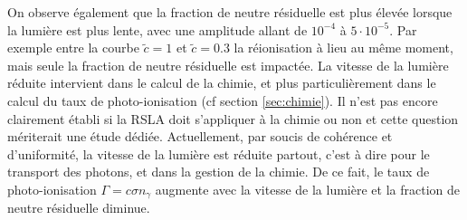 On observe également que la fraction de neutre résiduelle est plus élevée lorsque la lumière est plus lente, avec une amplitude allant de $10^{-4}$ à $5 \cdot 10 ^{-5}$.
Par exemple entre la courbe $\tilde{c}=1$ et $\tilde{c}=0.3$ la réionisation à lieu au même moment, mais seule la fraction de neutre résiduelle est impactée.
La vitesse de la lumière réduite intervient dans le calcul de la chimie, et plus particulièrement dans le calcul du taux de photo-ionisation (cf section \ref{sec:chimie}).
Il n'est pas encore clairement établi si la \ac{RSLA} doit s’appliquer à la chimie ou non et cette question mériterait une étude dédiée.
Actuellement, par soucis de cohérence et d'uniformité, la vitesse de la lumière est réduite partout, c'est à dire pour le transport des photons, et dans la gestion de la chimie.
De ce fait, le taux de photo-ionisation $\Gamma = c \sigma n_\gamma$ augmente avec la vitesse de la lumière et la fraction de neutre résiduelle diminue.





